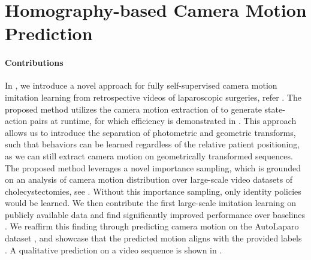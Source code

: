 \section{Homography-based Camera Motion Prediction}
\label{con:sec:hom_pred}
\paragraph{Contributions} In , we introduce a novel approach for fully self-supervised camera motion imitation learning from retrospective videos of laparoscopic surgeries, refer . The proposed method utilizes the camera motion extraction of  to generate state-action pairs at runtime, for which efficiency is demonstrated in . This approach allows us to introduce the separation of photometric and geometric transforms, such that behaviors can be learned regardless of the relative patient positioning, as we can still extract camera motion on geometrically transformed sequences. The proposed method leverages a novel importance sampling, which is grounded on an analysis of camera motion distribution over large-scale video datasets of cholecystectomies, see . Without this importance sampling, only identity policies would be learned. We then contribute the first large-scale imitation learning on publicly available data and find significantly improved performance over baselines . We reaffirm this finding through predicting camera motion on the AutoLaparo dataset \cite{wang2022autolaparo}, and showcase that the predicted motion aligns with the provided labels . A qualitative prediction on a video sequence is shown in .

